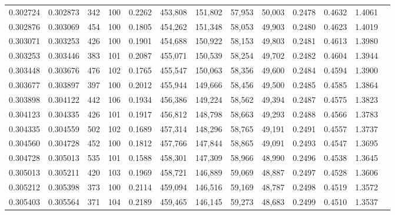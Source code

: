 \begin{tabular}{rrrrrrrrrrrrr}
0.302724 & 0.302873 &   342 & 100 &                                     0.2262 & 453,808 & 151,802 &  57,953 &  50,003 & 0.2478 & 0.4632 & 1.4061 \\
0.302876 & 0.303069 &   454 & 100 &                                     0.1805 & 454,262 & 151,348 &  58,053 &  49,903 & 0.2480 & 0.4623 & 1.4019 \\
0.303071 & 0.303253 &   426 & 100 &                                     0.1901 & 454,688 & 150,922 &  58,153 &  49,803 & 0.2481 & 0.4613 & 1.3980 \\
0.303253 & 0.303446 &   383 & 101 &                                     0.2087 & 455,071 & 150,539 &  58,254 &  49,702 & 0.2482 & 0.4604 & 1.3944 \\
0.303448 & 0.303676 &   476 & 102 &                                     0.1765 & 455,547 & 150,063 &  58,356 &  49,600 & 0.2484 & 0.4594 & 1.3900 \\
0.303677 & 0.303897 &   397 & 100 &                                     0.2012 & 455,944 & 149,666 &  58,456 &  49,500 & 0.2485 & 0.4585 & 1.3864 \\
0.303898 & 0.304122 &   442 & 106 &                                     0.1934 & 456,386 & 149,224 &  58,562 &  49,394 & 0.2487 & 0.4575 & 1.3823 \\
0.304123 & 0.304335 &   426 & 101 &                                     0.1917 & 456,812 & 148,798 &  58,663 &  49,293 & 0.2488 & 0.4566 & 1.3783 \\
0.304335 & 0.304559 &   502 & 102 &                                     0.1689 & 457,314 & 148,296 &  58,765 &  49,191 & 0.2491 & 0.4557 & 1.3737 \\
0.304560 & 0.304728 &   452 & 100 &                                     0.1812 & 457,766 & 147,844 &  58,865 &  49,091 & 0.2493 & 0.4547 & 1.3695 \\
0.304728 & 0.305013 &   535 & 101 &                                     0.1588 & 458,301 & 147,309 &  58,966 &  48,990 & 0.2496 & 0.4538 & 1.3645 \\
0.305013 & 0.305211 &   420 & 103 &                                     0.1969 & 458,721 & 146,889 &  59,069 &  48,887 & 0.2497 & 0.4528 & 1.3606 \\
0.305212 & 0.305398 &   373 & 100 &                                     0.2114 & 459,094 & 146,516 &  59,169 &  48,787 & 0.2498 & 0.4519 & 1.3572 \\
0.305403 & 0.305564 &   371 & 104 &                                     0.2189 & 459,465 & 146,145 &  59,273 &  48,683 & 0.2499 & 0.4510 & 1.3537 \\

\end{tabular}
